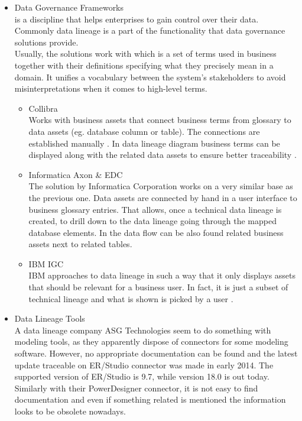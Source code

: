 \begin{itemize}
	\item Data Governance Frameworks \\ 
	 is a discipline that helps enterprises to gain control over their data. Commonly data lineage is a part of the functionality that data governance solutions provide. \\
	Usually, the solutions work with  which is a set of terms used in business together with their definitions specifying what they precisely mean in a domain. It unifies a vocabulary between the system's stakeholders to avoid misinterpretations when it comes to high-level terms. 
	\begin{itemize}
		\item Collibra \\ 
		Works with business assets that connect business terms from glossary to data assets (eg. database column or table). The connections are established manually \cite{CollibraBusinessAssets}. In data lineage diagram business terms can be displayed along with the related data assets to ensure better traceability \cite{CollibraVisualization}.
		\item Informatica Axon \& EDC \\ 
		The solution by Informatica Corporation works on a very similar base as the previous one.
		Data assets are connected by hand in a user interface to business glossary entries\cite{InformaticaBusinessAssets}. That allows, once a technical data lineage is created, to drill down to the data lineage going through the mapped database elements. In the data flow can be also found related business assets next to related tables.
		\item IBM IGC \\ 
		IBM approaches to data lineage in such a way that it only displays assets that should be relevant for a business user. In fact, it is just a subset of technical lineage and what is shown is picked by a user \cite{IbmIgcBusinessLineage}.
	\end{itemize}
	\item Data Lineage Tools \\ 
	A data lineage company ASG Technologies seem to do something with modeling tools, as they apparently dispose of connectors for some modeling software. However, no appropriate documentation can be found and the latest update traceable on ER/Studio connector was made in early 2014. \cite{AsgErStudio}
	The supported version of ER/Studio is 9.7, while version 18.0 is out today.
	Similarly with their PowerDesigner connector, it is not easy to find documentation and even if something related is mentioned the information looks to be obsolete nowadays.
	

\end{itemize}
